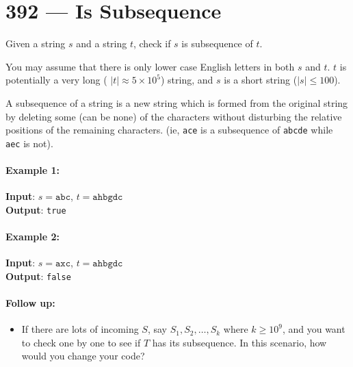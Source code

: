 \section{392 --- Is Subsequence}
Given a string $ s $ and a string $ t $, check if $ s $ is subsequence of $ t $.
\par
You may assume that there is only lower case English letters in both $ s $ and $ t $. $ t $ is potentially a very long ( $\lvert t\rvert \approx 5\times 10^5$) string, and $ s $ is a short string ($\lvert s\rvert\leq 100$).
\par
A subsequence of a string is a new string which is formed from the original string by deleting some (can be none) of the characters without disturbing the relative positions of the remaining characters. (ie, \texttt{ace} is a subsequence of \texttt{abcde} while \texttt{aec} is not).

\paragraph{Example 1:}
\begin{flushleft}
\textbf{Input}: $s = \texttt{abc}$, $t = \texttt{ahbgdc}$
\\
\textbf{Output}: \texttt{true}
\end{flushleft}

\paragraph{Example 2:}
\begin{flushleft}
\textbf{Input}: $s = \texttt{axc}$, $t = \texttt{ahbgdc}$
\\
\textbf{Output}: \texttt{false}
\end{flushleft}

\paragraph{Follow up:}
\begin{itemize}
\item If there are lots of incoming $ S $, say $S_1, S_2, \ldots , S_k$ where $k \geq 10^9$, and you want to check one by one to see if $T$ has its subsequence. In this scenario, how would you change your code?
\end{itemize}
